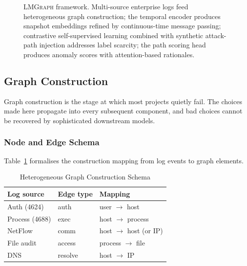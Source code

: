 \documentclass[sigconf,nonacm]{acmart}
\begin{document}
\begin{figure}[t]
\caption{\textsc{LMGraph} framework. Multi-source enterprise logs feed
  heterogeneous graph construction; the temporal encoder produces snapshot
  embeddings refined by continuous-time message passing; contrastive
  self-supervised learning combined with synthetic attack-path injection
  addresses label scarcity; the path scoring head produces anomaly scores
  with attention-based rationales.}
\label{fig:framework}
\end{figure}

\subsection{Graph Construction}

Graph construction is the stage at which most projects quietly fail. The
choices made here propagate into every subsequent component, and bad choices
cannot be recovered by sophisticated downstream models.

\subsubsection{Node and Edge Schema}

Table~\ref{tab:schema} formalises the construction mapping from log events to
graph elements.

\begin{table}[h]
\caption{Heterogeneous Graph Construction Schema}
\label{tab:schema}
\small
\begin{tabularx}{\columnwidth}{@{}p{2.2cm}p{2.0cm}X@{}}
\toprule
\textbf{Log source} & \textbf{Edge type} & \textbf{Mapping} \\
\midrule
Auth (4624)      & auth   & user $\to$ host \\
Process (4688)   & exec   & host $\to$ process \\
NetFlow          & comm   & host $\to$ host (or IP) \\
File audit       & access & process $\to$ file \\
DNS              & resolve & host $\to$ IP \\
\bottomrule
\end{tabularx}
\end{table}
\end{document}
